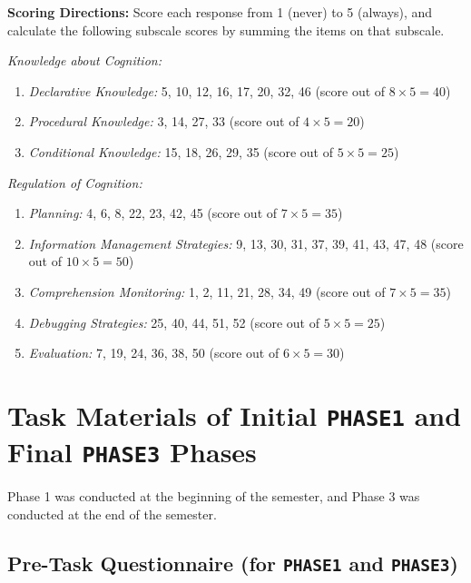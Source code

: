 \documentclass[letterpaper, nobind]{templates/ociamthesis}
\providecommand{\tightlist}{%
  \setlength{\itemsep}{0pt}\setlength{\parskip}{0pt}}
\begin{document}
\textbf{Scoring Directions:} Score each response from 1 (never) to 5
(always), and calculate the following subscale scores by summing the
items on that subscale.

\emph{Knowledge about Cognition:}

\begin{enumerate}
\def\labelenumi{\arabic{enumi}.}
\tightlist
\item
  \emph{Declarative Knowledge:} 5, 10, 12, 16, 17, 20, 32, 46 (score out of \(8\times5 = 40\))
\item
  \emph{Procedural Knowledge:} 3, 14, 27, 33 (score out of \(4\times5 = 20\))
\item
  \emph{Conditional Knowledge:} 15, 18, 26, 29, 35 (score out of \(5\times5 = 25\))
\end{enumerate}

\emph{Regulation of Cognition:}

\begin{enumerate}
\def\labelenumi{\arabic{enumi}.}
\tightlist
\item
  \emph{Planning:} 4, 6, 8, 22, 23, 42, 45 (score out of \(7\times5 = 35\))
\item
  \emph{Information Management Strategies:} 9, 13, 30, 31, 37, 39, 41, 43, 47, 48 (score out of \(10\times5 = 50\))
\item
  \emph{Comprehension Monitoring:} 1, 2, 11, 21, 28, 34, 49 (score out of \(7\times5 = 35\))
\item
  \emph{Debugging Strategies:} 25, 40, 44, 51, 52 (score out of \(5\times5 = 25\))
\item
  \emph{Evaluation:} 7, 19, 24, 36, 38, 50 (score out of \(6\times5 = 30\))
\end{enumerate}

\hypertarget{app-phase13}{%
\chapter{\texorpdfstring{Task Materials of Initial \texttt{PHASE1} and Final \texttt{PHASE3} Phases}{Task Materials of Initial PHASE1 and Final PHASE3 Phases}}\label{app-phase13}}

Phase 1 was conducted at the beginning of the semester,
and Phase 3 was conducted at the end of the
semester.

\hypertarget{app-phase13-pretask}{%
\section{\texorpdfstring{Pre-Task Questionnaire (for \texttt{PHASE1} and \texttt{PHASE3})}{Pre-Task Questionnaire (for PHASE1 and PHASE3)}}\label{app-phase13-pretask}}
\end{document}
